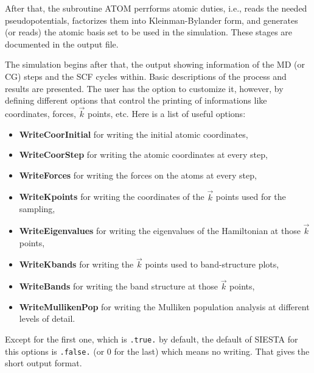 After that, the subroutine ATOM perrforms atomic duties, i.e., 
reads the needed pseudopotentials, factorizes them into Kleinman-Bylander
form, and generates (or reads) the atomic basis set to be used in the
simulation. These stages are documented in the output file.

The simulation begins after that, the output showing information
of the MD (or CG) steps and the SCF cycles within.
Basic descriptions of the process and results are
presented. The user has the option to customize it,
however, by defining different
options that control the printing of informations
like coordinates, forces, $\vec k$ points, etc.
Here is a list of useful options: 
 
\begin{itemize}
\item
{\bf WriteCoorInitial}
for writing the initial atomic coordinates,
\item
{\bf WriteCoorStep}
for writing the atomic coordinates at every step,
\item
{\bf WriteForces}
for writing the forces on the atoms at every step,
\item
{\bf WriteKpoints}
for writing the coordinates of the $\vec k$ points used for the sampling,
\item
{\bf WriteEigenvalues}
for writing the eigenvalues of the Hamiltonian at those $\vec k$ points,
\item
{\bf WriteKbands}
for writing the $\vec k$ points used to band-structure plots,
\item
{\bf WriteBands}
for writing the band structure at those $\vec k$ points,
\item
{\bf WriteMullikenPop}
for writing the Mulliken population analysis at different levels of detail.
\end{itemize}

Except for the first one, which is {\tt .true.} by default, the
default of SIESTA for this options is {\tt .false.} (or 0 for the last)
which means no writing. That gives the short output format.

